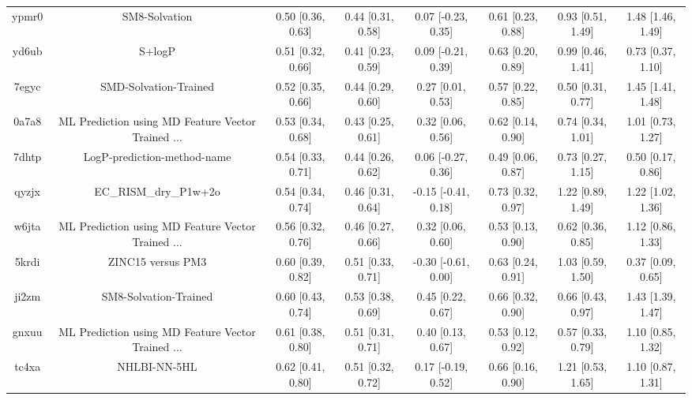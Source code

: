 \documentclass{article}
\begin{document}
\begin{center}
\begin{longtable}{|cccccccc|}
 ypmr0 &                                      SM8-Solvation &  0.50 [0.36, 0.63] &  0.44 [0.31, 0.58] &    0.07 [-0.23, 0.35] &  0.61 [0.23, 0.88] &    0.93 [0.51, 1.49] &     1.48 [1.46, 1.49] \\
 yd6ub &                                             S+logP &  0.51 [0.32, 0.66] &  0.41 [0.23, 0.59] &    0.09 [-0.21, 0.39] &  0.63 [0.20, 0.89] &    0.99 [0.46, 1.41] &     0.73 [0.37, 1.10] \\
 7egyc &                              SMD-Solvation-Trained &  0.52 [0.35, 0.66] &  0.44 [0.29, 0.60] &     0.27 [0.01, 0.53] &  0.57 [0.22, 0.85] &    0.50 [0.31, 0.77] &     1.45 [1.41, 1.48] \\
 0a7a8 &  ML Prediction using MD Feature Vector Trained ... &  0.53 [0.34, 0.68] &  0.43 [0.25, 0.61] &     0.32 [0.06, 0.56] &  0.62 [0.14, 0.90] &    0.74 [0.34, 1.01] &     1.01 [0.73, 1.27] \\
 7dhtp &                        LogP-prediction-method-name &  0.54 [0.33, 0.71] &  0.44 [0.26, 0.62] &    0.06 [-0.27, 0.36] &  0.49 [0.06, 0.87] &    0.73 [0.27, 1.15] &     0.50 [0.17, 0.86] \\
 qyzjx &                              EC\_RISM\_dry\_P1w+2o &  0.54 [0.34, 0.74] &  0.46 [0.31, 0.64] &   -0.15 [-0.41, 0.18] &  0.73 [0.32, 0.97] &    1.22 [0.89, 1.49] &     1.22 [1.02, 1.36] \\
 w6jta &  ML Prediction using MD Feature Vector Trained ... &  0.56 [0.32, 0.76] &  0.46 [0.27, 0.66] &     0.32 [0.06, 0.60] &  0.53 [0.13, 0.90] &    0.62 [0.36, 0.85] &     1.12 [0.86, 1.33] \\
 5krdi &                                  ZINC15 versus PM3 &  0.60 [0.39, 0.82] &  0.51 [0.33, 0.71] &   -0.30 [-0.61, 0.00] &  0.63 [0.24, 0.91] &    1.03 [0.59, 1.50] &     0.37 [0.09, 0.65] \\
 ji2zm &                              SM8-Solvation-Trained &  0.60 [0.43, 0.74] &  0.53 [0.38, 0.69] &     0.45 [0.22, 0.67] &  0.66 [0.32, 0.90] &    0.66 [0.43, 0.97] &     1.43 [1.39, 1.47] \\
 gnxuu &  ML Prediction using MD Feature Vector Trained ... &  0.61 [0.38, 0.80] &  0.51 [0.31, 0.71] &     0.40 [0.13, 0.67] &  0.53 [0.12, 0.92] &    0.57 [0.33, 0.79] &     1.10 [0.85, 1.32] \\
 tc4xa &                                       NHLBI-NN-5HL &  0.62 [0.41, 0.80] &  0.51 [0.32, 0.72] &    0.17 [-0.19, 0.52] &  0.66 [0.16, 0.90] &    1.21 [0.53, 1.65] &     1.10 [0.87, 1.31] \\

\end{longtable}
\end{center}
\end{document}
